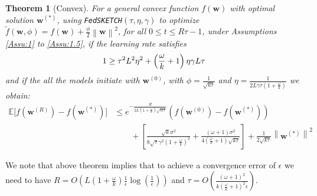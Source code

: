 \documentclass[twoside]{article}
\newtheorem{theorem}{Theorem}
\begin{document}
\begin{theorem}[Convex]\label{thm:cvx-iid}
 For a general convex function $f(\boldsymbol{w})$ with optimal solution $\boldsymbol{w}^{(*)}$, using  \texttt{FedSKETCH}$(\tau, \eta, \gamma)$ to optimize $\tilde{f}(\boldsymbol{w},\phi)=f(\mathbf{\boldsymbol{w}})+\frac{\phi}{2}\left\|\boldsymbol{w}\right\|^2$,  for all $0\leq t\leq R\tau-1$,  under Assumptions \ref{Assu:1} to \ref{Assu:1.5}, if the learning rate satisfies 
 \begin{align}\notag
   1\geq {\tau^2 L^2\eta^2}+\left(\frac{\omega}{k}+1\right){\eta\gamma L}{\tau} 
\end{align}
and if the all the models initiate with $\boldsymbol{w}^{(0)}$, with $\phi=\frac{1}{\sqrt{k\tau}}$ and $\eta=\frac{1}{2L\gamma\tau\left(1+\frac{\omega}{k}\right)}$ we obtain:
\begin{align}
        \mathbb{E}\Big[f({\boldsymbol{w}}^{(R)})-f({\boldsymbol{w}}^{(*)})\Big]&\leq e^{-\frac{ R}{2L\left(1+\frac{\omega}{k}\right) \sqrt{m\tau}}}\left(f(\boldsymbol{w}^{(0)})-f(\boldsymbol{w}^{(*)})\right)\nonumber\\
        &\qquad +\left[\frac{\sqrt{k}\sigma^2}{8\sqrt{\tau}\gamma^2\left(1+\frac{\omega}{k}\right)^2} +\frac{\left(\omega+1\right)\sigma^2}{4\left(\frac{\omega}{k}+1\right)\sqrt{k\tau}} \right] +\frac{1}{2\sqrt{k\tau}}\left\|\boldsymbol{w}^{(*)}\right\|^2\label{eq:cvx-iid}
\end{align}{{}}
\end{theorem}
We note that above theorem implies that to achieve a convergence error of $\epsilon$ we need to have $R=O\left(L\left(1+\frac{\omega}{k}\right)\frac{1}{\epsilon}\log\left(\frac{1}{\epsilon}\right)\right)$ and $\tau=O\left(\frac{\left(\omega+1\right)^2}{k\left(\frac{\omega}{k}+1\right)^2\epsilon}\right)$.
\end{document}
